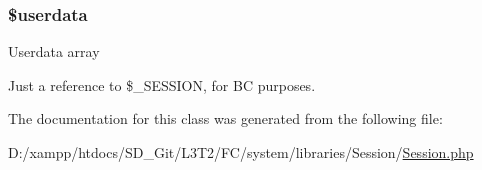 \subsubsection[{\$userdata}]{\setlength{\rightskip}{0pt plus 5cm}\${\bf userdata}}\label{class_c_i___session_af70e594e86a310311c717b13e6ecac00}
Userdata array

Just a reference to \$\+\_\+\+S\+E\+S\+S\+I\+O\+N, for B\+C purposes. 

The documentation for this class was generated from the following file\+:\begin{DoxyCompactItemize}
\item 
D\+:/xampp/htdocs/\+S\+D\+\_\+\+Git/\+L3\+T2/\+F\+C/system/libraries/\+Session/\hyperlink{system_2libraries_2_session_2_session_8php}{Session.\+php}\end{DoxyCompactItemize}
